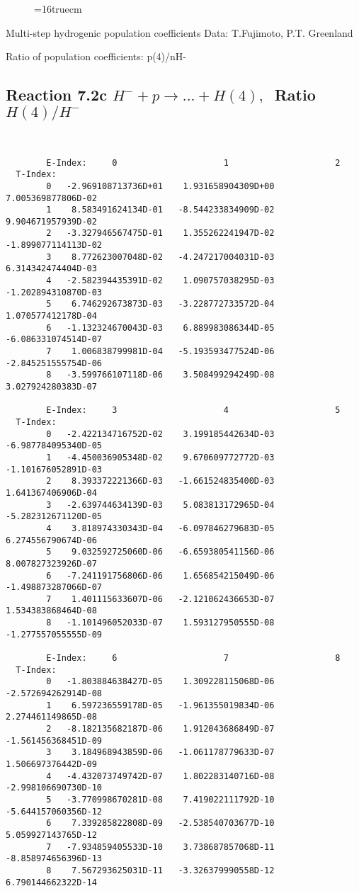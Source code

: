 \documentclass[12pt]{article}
\begin{document}
\begin{figure} \label{7.2b}
\epsfxsize=16truecm
\end{figure}
\newpage

 Multi-step hydrogenic population coefficients
 Data: T.Fujimoto, P.T. Greenland

 Ratio of population coefficients: p(4)/nH-

\subsection{
Reaction 7.2c $ H^- + p \rightarrow ...+ H(4) , \  $
Ratio $H(4)/H^- $
}

\begin{small}\begin{verbatim}


        E-Index:     0                     1                     2
  T-Index:
        0   -2.969108713736D+01    1.931658904309D+00    7.005369877806D-02
        1    8.583491624134D-01   -8.544233834909D-02    9.904671957939D-02
        2   -3.327946567475D-01    1.355262241947D-02   -1.899077114113D-02
        3    8.772623007048D-02   -4.247217004031D-03    6.314342474404D-03
        4   -2.582394435391D-02    1.090757038295D-03   -1.202894310870D-03
        5    6.746292673873D-03   -3.228772733572D-04    1.070577412178D-04
        6   -1.132324670043D-03    6.889983086344D-05   -6.086331074514D-07
        7    1.006838799981D-04   -5.193593477524D-06   -2.845251555754D-06
        8   -3.599766107118D-06    3.508499294249D-08    3.027924280383D-07

        E-Index:     3                     4                     5
  T-Index:
        0   -2.422134716752D-02    3.199185442634D-03   -6.987784095340D-05
        1   -4.450036905348D-02    9.670609772772D-03   -1.101676052891D-03
        2    8.393372221366D-03   -1.661524835400D-03    1.641367406906D-04
        3   -2.639744634139D-03    5.083813172965D-04   -5.282312671120D-05
        4    3.818974330343D-04   -6.097846279683D-05    6.274556790674D-06
        5    9.032592725060D-06   -6.659380541156D-06    8.007827323926D-07
        6   -7.241191756806D-06    1.656854215049D-06   -1.498873287066D-07
        7    1.401115633607D-06   -2.121062436653D-07    1.534383868464D-08
        8   -1.101496052033D-07    1.593127950555D-08   -1.277557055555D-09

        E-Index:     6                     7                     8
  T-Index:
        0   -1.803884638427D-05    1.309228115068D-06   -2.572694262914D-08
        1    6.597236559178D-05   -1.961355019834D-06    2.274461149865D-08
        2   -8.182135682187D-06    1.912043686849D-07   -1.561456368451D-09
        3    3.184968943859D-06   -1.061178779633D-07    1.506697376442D-09
        4   -4.432073749742D-07    1.802283140716D-08   -2.998106690730D-10
        5   -3.770998670281D-08    7.419022111792D-10   -5.644157060356D-12
        6    7.339285822808D-09   -2.538540703677D-10    5.059927143765D-12
        7   -7.934859405533D-10    3.738687857068D-11   -8.858974656396D-13
        8    7.567293625031D-11   -3.326379990558D-12    6.790144662322D-14


\end{verbatim}
\end{small}
\end{document}
